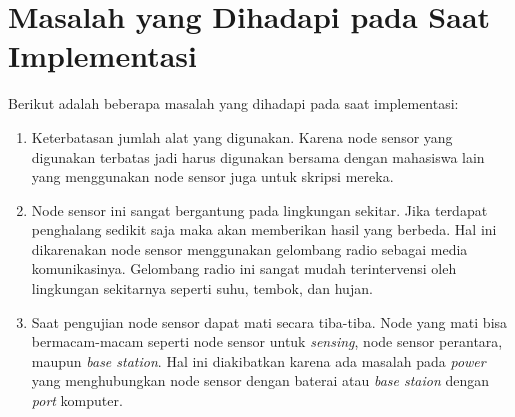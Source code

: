 \section{Masalah yang Dihadapi pada Saat Implementasi}
Berikut adalah beberapa masalah yang dihadapi pada saat implementasi:
\begin{enumerate}
    \item Keterbatasan jumlah alat yang digunakan. Karena node sensor yang digunakan terbatas jadi harus digunakan bersama dengan mahasiswa lain yang menggunakan node sensor juga untuk skripsi mereka. 
    \item Node sensor ini sangat bergantung pada lingkungan sekitar. Jika terdapat penghalang sedikit saja maka akan memberikan hasil yang berbeda. Hal ini dikarenakan node sensor menggunakan gelombang radio sebagai media komunikasinya. Gelombang radio ini sangat mudah terintervensi oleh lingkungan sekitarnya seperti suhu, tembok, dan hujan.
    \item Saat pengujian node sensor dapat mati secara tiba-tiba. Node yang mati bisa bermacam-macam seperti node sensor untuk \textit{sensing}, node sensor perantara, maupun \textit{base station}. Hal ini diakibatkan karena ada masalah pada \textit{power} yang menghubungkan node sensor dengan baterai atau \textit{base staion} dengan \textit{port} komputer.
\end{enumerate}